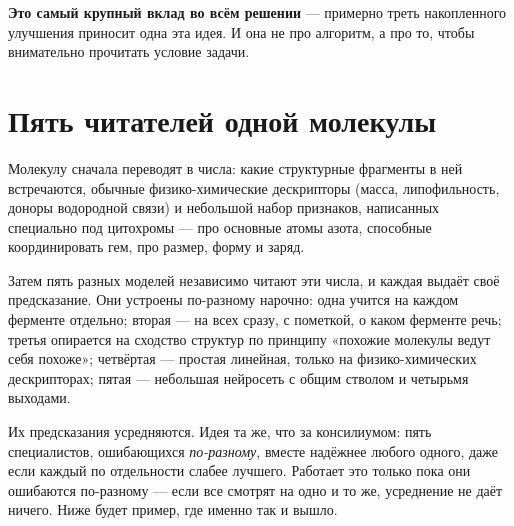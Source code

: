 \documentclass[11pt,a4paper]{article}
\begin{document}
\textbf{Это самый крупный вклад во всём решении} --- примерно треть накопленного улучшения
приносит одна эта идея. И она не про алгоритм, а про то, чтобы внимательно прочитать условие
задачи.

\section{Пять читателей одной молекулы}

Молекулу сначала переводят в числа: какие структурные фрагменты в ней встречаются, обычные
физико-химические дескрипторы (масса, липофильность, доноры водородной связи) и небольшой
набор признаков, написанных специально под цитохромы --- про основные атомы азота, способные
координировать гем, про размер, форму и заряд.

Затем пять разных моделей независимо читают эти числа, и каждая выдаёт своё предсказание.
Они устроены по-разному нарочно: одна учится на каждом ферменте отдельно; вторая --- на всех
сразу, с пометкой, о каком ферменте речь; третья опирается на сходство структур по принципу
«похожие молекулы ведут себя похоже»; четвёртая --- простая линейная, только на
физико-химических дескрипторах; пятая --- небольшая нейросеть с общим стволом и четырьмя
выходами.

Их предсказания усредняются. Идея та же, что за консилиумом: пять специалистов, ошибающихся
\emph{по-разному}, вместе надёжнее любого одного, даже если каждый по отдельности слабее
лучшего. Работает это только пока они ошибаются по-разному --- если все смотрят на одно и то
же, усреднение не даёт ничего. Ниже будет пример, где именно так и вышло.

\begin{center}
\end{center}
\end{document}
